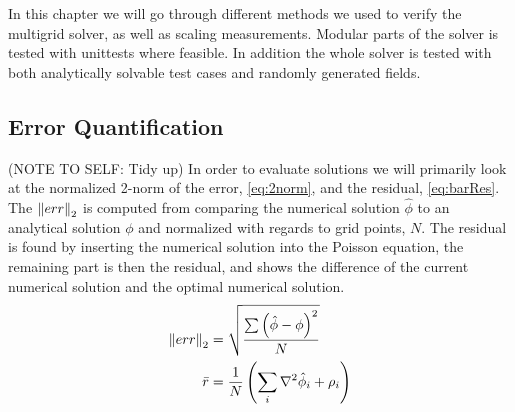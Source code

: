 In this chapter we will go through different methods we used to verify the multigrid
solver, as well as scaling measurements. Modular parts of the solver is tested with unittests
where feasible. In addition the whole solver is tested with both analytically solvable
test cases and randomly generated fields.


\subsection{Error Quantification}
	\label{sec:errorQuant}
    (NOTE TO SELF: Tidy up)
	In order to evaluate solutions we will primarily look at the normalized 2-norm of the error, \cref{eq:2norm},
	and the residual, \cref{eq:barRes}. The \(\norm{ err }_2\) is computed from comparing the numerical
	solution \(\hat{\phi}\) to an analytical solution \(\phi\) and normalized with regards to grid points, \(N\).
	The residual is found by inserting the numerical solution into the Poisson equation, the remaining
	part is then the residual, and shows the difference of the current numerical solution
	and the optimal numerical solution.
	\begin{align}
		\norm{ err }_2&= \sqrt{\frac{\sum \left(\hat\phi - \phi\right)^2}{N}}  \label{eq:2norm}
		\\
		\bar{r} &= \frac{1}{N}\left( \sum_i{ \nabla^2 \hat{\phi}_i + \rho_i  }  \right) \label{eq:barRes}
	\end{align}
